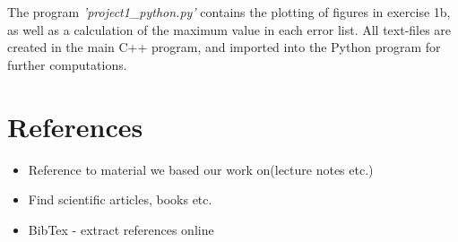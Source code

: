 \documentclass[12pt]{article}
\begin{document}
\noindent The program \textit{'project1\_python.py'} contains the plotting of figures in exercise 1b, as well as a calculation of the maximum value in each error list. All text-files are created in the main C++ program, and imported into the Python program for further computations. 

\section{References}

\begin{itemize}
\item Reference to material we based our work on(lecture notes etc.)
\item Find scientific articles, books etc.
\item BibTex - extract references online
\end{itemize}
\end{document}
